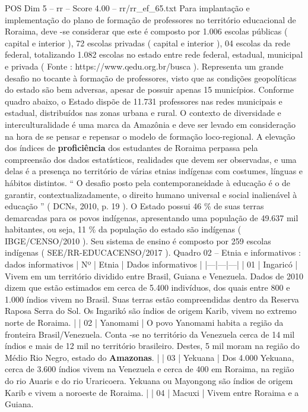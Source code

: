\begin{textsample}{POS Dim 5 – rr – Score 4.00 – rr/rr\_ef\_65.txt}
Para implantação e implementação do plano de formação de professores no território educacional de Roraima, deve -se considerar que este é composto por 1.006 escolas públicas ( capital e interior ), 72 escolas privadas ( capital e interior ), 04 escolas da rede federal, totalizando 1.082 escolas no estado entre rede federal, estadual, municipal e privada ( Fonte : https://www.qedu.org.br/busca ).
Representa um grande desafio no tocante à formação de professores, visto que as condições geopolíticas do estado são bem adversas, apesar de possuir apenas 15 municípios.
Conforme quadro abaixo, o Estado dispõe de 11.731 professores nas redes municipais e estadual, distribuídos nas zonas urbana e rural.
O contexto de diversidade e interculturalidade é uma marca da Amazônia e deve ser levado em consideração na hora de se pensar e repensar o modelo de formação loco-regional.
A elevação dos índices de \textbf{proficiência} dos estudantes de Roraima perpassa pela compreensão dos dados estatísticos, realidades que devem ser observadas, e uma delas é a presença no território de várias etnias indígenas com costumes, línguas e hábitos distintos. “ O desafio posto pela contemporaneidade à educação é o de garantir, contextualizadamente, o direito humano universal e social inalienável à educação ” ( DCNs, 2010, p. 19 ).
O Estado possui 46 \% de suas terras demarcadas para os povos indígenas, apresentando uma população de 49.637 mil habitantes, ou seja, 11 \% da população do estado são indígenas ( IBGE/CENSO/2010 ).
Seu sistema de ensino é composto por 259 escolas indígenas ( SEE/RR-EDUCACENSO/2017 ).
Quadro 02 – Etnia e informativos : dados informativos | Nº | Etnia | Dados informativos | |---|---|---| | 01 | Ingaricó | Vivem em um território dividido entre Brasil, Guiana e Venezuela.
Dados de 2010 dizem que estão estimados em cerca de 5.400 indivíduos, dos quais entre 800 e 1.000 índios vivem no Brasil.
Suas terras estão compreendidas dentro da Reserva Raposa Serra do Sol.
Os Ingarikó são índios de origem Karib, vivem no extremo norte de Roraima. | | 02 | Yanomami | O povo Yanomami habita a região da fronteira Brasil/Venezuela.
Conta -se no território da Venezuela cerca de 14 mil índios e mais de 12 mil no território brasileiro.
Destes, 5 mil moram na região do Médio Rio Negro, estado do \textbf{Amazonas}. | | 03 | Yekuana | Dos 4.000 Yekuana, cerca de 3.600 índios vivem na Venezuela e cerca de 400 em Roraima, na região do rio Auaris e do rio Uraricoera.
Yekuana ou Mayongong são índios de origem Karib e vivem a noroeste de Roraima. | | 04 | Macuxi | Vivem entre Roraima e a Guiana.

\end{textsample}
